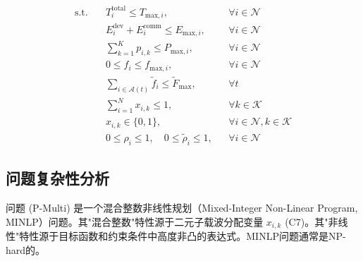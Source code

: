 \documentclass[11pt, a4paper]{article}
\begin{document}
\begin{align}
\text{s.t.} \quad & T_i^{\text{total}} \le T_{\text{max}, i}, && \forall i \in \mathcal{N} \tag{C1: QoS约束} \\
& E_i^{\text{dev}} + E_i^{\text{comm}} \le E_{\text{max}, i}, && \forall i \in \mathcal{N} \tag{C2: 设备能量预算} \\
& \sum_{k=1}^K p_{i,k} \le P_{\text{max}, i}, && \forall i \in \mathcal{N} \tag{C3: 设备最大发射功率} \\
& 0 \le f_i \le f_{\text{max}, i}, && \forall i \in \mathcal{N} \tag{C4: 设备最大CPU频率} \\
& \sum_{i \in \mathcal{A}(t)} \tilde{f}_i \le \tilde{F}_{\text{max}}, && \forall t \tag{C5: 服务器总CPU频率} \\
& \sum_{i=1}^N x_{i,k} \le 1, && \forall k \in \mathcal{K} \tag{C6: OFDMA子载波唯一分配} \\
& x_{i,k} \in \{0, 1\}, && \forall i \in \mathcal{N}, k \in \mathcal{K} \tag{C7: 二元分配变量} \\
& 0 \le \rho_i \le 1, \quad 0 \le \tilde{\rho}_i \le 1, && \forall i \in \mathcal{N} \tag{C8: 剪枝率范围}
\end{align}

\subsection{问题复杂性分析}

问题 (P-Multi) 是一个混合整数非线性规划（Mixed-Integer Non-Linear Program, MINLP）问题。其"混合整数"特性源于二元子载波分配变量 $x_{i,k}$ (C7)。其"非线性"特性源于目标函数和约束条件中高度非凸的表达式。MINLP问题通常是NP-hard的。
\end{document}
